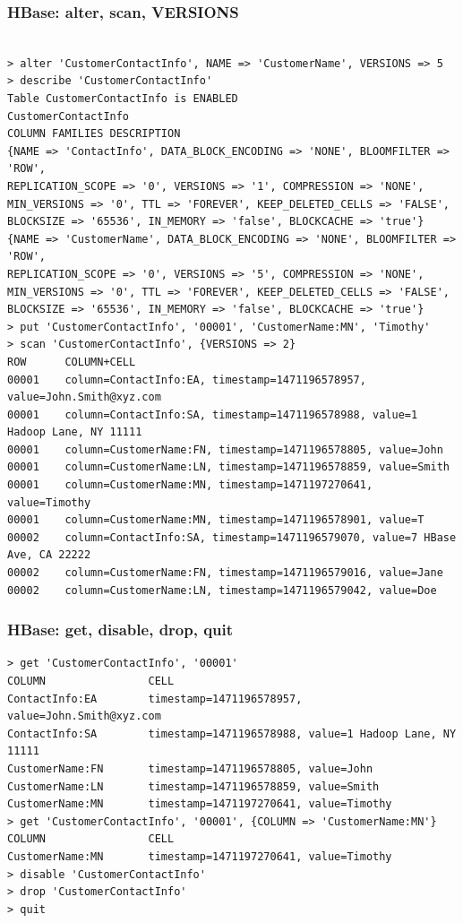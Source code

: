 \documentclass{beamer}
\begin{document}
\begin{frame}[fragile]
 \frametitle{HBase: alter, scan, VERSIONS}
{\color{mycolorcli}
  \begin{lstlisting}[frame=single, basicstyle=\tiny]

> alter 'CustomerContactInfo', NAME => 'CustomerName', VERSIONS => 5
> describe 'CustomerContactInfo'
Table CustomerContactInfo is ENABLED                                     
CustomerContactInfo
COLUMN FAMILIES DESCRIPTION
{NAME => 'ContactInfo', DATA_BLOCK_ENCODING => 'NONE', BLOOMFILTER => 'ROW', 
REPLICATION_SCOPE => '0', VERSIONS => '1', COMPRESSION => 'NONE', 
MIN_VERSIONS => '0', TTL => 'FOREVER', KEEP_DELETED_CELLS => 'FALSE', 
BLOCKSIZE => '65536', IN_MEMORY => 'false', BLOCKCACHE => 'true'}                                     
{NAME => 'CustomerName', DATA_BLOCK_ENCODING => 'NONE', BLOOMFILTER => 'ROW', 
REPLICATION_SCOPE => '0', VERSIONS => '5', COMPRESSION => 'NONE', 
MIN_VERSIONS => '0', TTL => 'FOREVER', KEEP_DELETED_CELLS => 'FALSE', 
BLOCKSIZE => '65536', IN_MEMORY => 'false', BLOCKCACHE => 'true'}
> put 'CustomerContactInfo', '00001', 'CustomerName:MN', 'Timothy'
> scan 'CustomerContactInfo', {VERSIONS => 2}
ROW      COLUMN+CELL 
00001    column=ContactInfo:EA, timestamp=1471196578957, value=John.Smith@xyz.com 
00001    column=ContactInfo:SA, timestamp=1471196578988, value=1 Hadoop Lane, NY 11111 
00001    column=CustomerName:FN, timestamp=1471196578805, value=John 
00001    column=CustomerName:LN, timestamp=1471196578859, value=Smith 
00001    column=CustomerName:MN, timestamp=1471197270641, value=Timothy 
00001    column=CustomerName:MN, timestamp=1471196578901, value=T 
00002    column=ContactInfo:SA, timestamp=1471196579070, value=7 HBase Ave, CA 22222 
00002    column=CustomerName:FN, timestamp=1471196579016, value=Jane 
00002    column=CustomerName:LN, timestamp=1471196579042, value=Doe
  \end{lstlisting}
}
\end{frame}

\begin{frame}[fragile]
 \frametitle{HBase: get, disable, drop, quit}
{\color{mycolorcli}
  \begin{lstlisting}[frame=single, basicstyle=\tiny]
> get 'CustomerContactInfo', '00001'
COLUMN                CELL 
ContactInfo:EA        timestamp=1471196578957, value=John.Smith@xyz.com 
ContactInfo:SA        timestamp=1471196578988, value=1 Hadoop Lane, NY 11111 
CustomerName:FN       timestamp=1471196578805, value=John 
CustomerName:LN       timestamp=1471196578859, value=Smith 
CustomerName:MN       timestamp=1471197270641, value=Timothy
> get 'CustomerContactInfo', '00001', {COLUMN => 'CustomerName:MN'}
COLUMN                CELL 
CustomerName:MN       timestamp=1471197270641, value=Timothy
> disable 'CustomerContactInfo'
> drop 'CustomerContactInfo'
> quit
  \end{lstlisting}
}
\end{frame}
\end{document}
